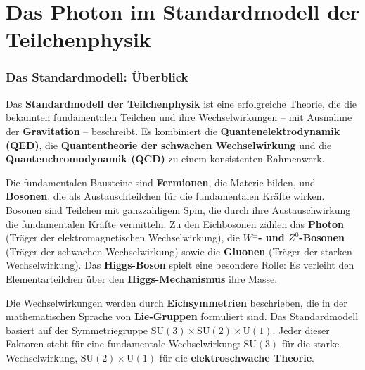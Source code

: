 \chapter{Das Photon im Standardmodell der Teilchenphysik}
\setcounter{section}{8}
\setcounter{subsection}{0}
\setcounter{subsubsection}{1}
\setcounter{secnumdepth}{3}

\subsection{Das Standardmodell: Überblick}

Das \textbf{Standardmodell der Teilchenphysik} ist eine erfolgreiche Theorie, die die bekannten fundamentalen Teilchen und ihre Wechselwirkungen – mit Ausnahme der \textbf{Gravitation} – beschreibt.  
Es kombiniert die \textbf{Quantenelektrodynamik (QED)}, die \textbf{Quantentheorie der schwachen Wechselwirkung} und die \textbf{Quantenchromodynamik (QCD)} zu einem konsistenten Rahmenwerk.

Die fundamentalen Bausteine sind \textbf{Fermionen}, die Materie bilden, und \textbf{Bosonen}, die als Austauschteilchen für die fundamentalen Kräfte wirken.  
Bosonen sind Teilchen mit ganzzahligem Spin, die durch ihre Austauschwirkung die fundamentalen Kräfte vermitteln.  
Zu den Eichbosonen zählen das \textbf{Photon} (Träger der elektromagnetischen Wechselwirkung), die \textbf{$W^\pm$- und $Z^0$-Bosonen} (Träger der schwachen Wechselwirkung) sowie die \textbf{Gluonen} (Träger der starken Wechselwirkung).  
Das \textbf{Higgs-Boson} spielt eine besondere Rolle: Es verleiht den Elementarteilchen über den \textbf{Higgs-Mechanismus} ihre Masse.

Die Wechselwirkungen werden durch \textbf{Eichsymmetrien} beschrieben, die in der mathematischen Sprache von \textbf{Lie-Gruppen} formuliert sind.  
Das Standardmodell basiert auf der Symmetriegruppe \(\mathrm{SU(3)} \times \mathrm{SU(2)} \times \mathrm{U(1)}\).  
Jeder dieser Faktoren steht für eine fundamentale Wechselwirkung:  
\(\mathrm{SU(3)}\) für die starke Wechselwirkung, \(\mathrm{SU(2)} \times \mathrm{U(1)}\) für die \textbf{elektroschwache Theorie}.


